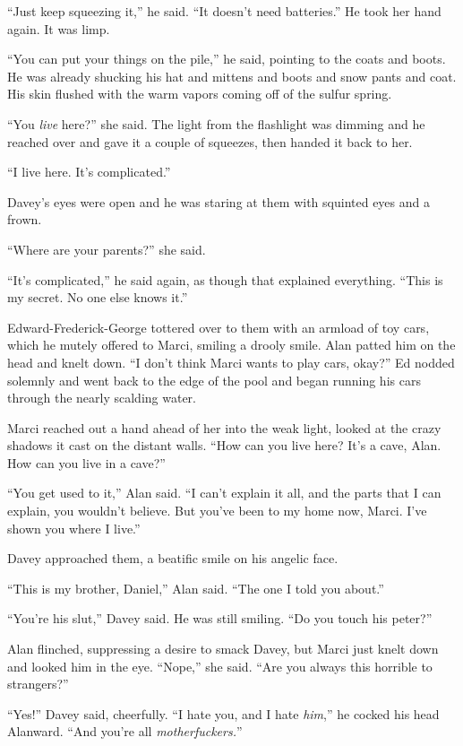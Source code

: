 ``Just keep squeezing it,'' he said.  ``It doesn't need batteries.''
He took her hand again.  It was limp.

``You can put your things on the pile,'' he said, pointing to the
coats and boots.  He was already shucking his hat and mittens and
boots and snow pants and coat.  His skin flushed with the warm vapors
coming off of the sulfur spring.

``You \textit{live} here?'' she said.  The light from the flashlight
was dimming and he reached over and gave it a couple of squeezes, then
handed it back to her.

``I live here.  It's complicated.''

Davey's eyes were open and he was staring at them with squinted eyes
and a frown.

``Where are your parents?'' she said.

``It's complicated,'' he said again, as though that explained
everything.  ``This is my secret.  No one else knows it.''

Edward-Frederick-George tottered over to them with an armload of toy
cars, which he mutely offered to Marci, smiling a drooly smile.  Alan
patted him on the head and knelt down.  ``I don't think Marci wants to
play cars, okay?'' Ed nodded solemnly and went back to the edge of the
pool and began running his cars through the nearly scalding water.

Marci reached out a hand ahead of her into the weak light, looked at
the crazy shadows it cast on the distant walls.  ``How can you live
here?  It's a cave, Alan.  How can you live in a cave?''

``You get used to it,'' Alan said.  ``I can't explain it all, and the
parts that I can explain, you wouldn't believe.  But you've been to my
home now, Marci.  I've shown you where I live.''

Davey approached them, a beatific smile on his angelic face.

``This is my brother, Daniel,'' Alan said.  ``The one I told you
about.''

``You're his slut,'' Davey said.  He was still smiling.  ``Do you
touch his peter?''

Alan flinched, suppressing a desire to smack Davey, but Marci just
knelt down and looked him in the eye.  ``Nope,'' she said.  ``Are you
always this horrible to strangers?''

``Yes!'' Davey said, cheerfully.  ``I hate you, and I hate
\textit{him},'' he cocked his head Alanward.  ``And you're all
\textit{motherfuckers.}''

